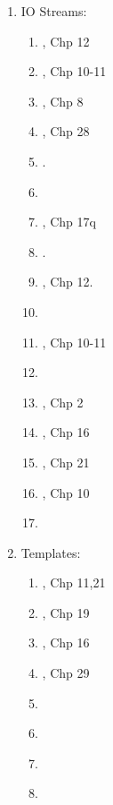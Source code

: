 \begin{enumerate}
\begin{enumerate}
\begin{enumerate}
		\end{enumerate}
	\end{enumerate}
\item IO Streams: \vspace{-0.3cm}
	\begin{enumerate} \itemsep -2pt
	\item \cite{Gregoire2014}, Chp 12
	\item \cite{Stroustrup2014}, Chp 10-11
	\item \cite{Lippman2013}, Chp 8
	\item \cite{Allain2012}, Chp 28
	\item \cite[chp. 12]{Gaddis2012}.
	\item \cite[pp. 743--847]{Josuttis2012}
	\item \cite{Prata2012}, Chp 17q
	\item \cite[Chp. 13]{Gaddis2011}.
	\item \cite{Gaddis2010}, Chp 12.
	\item \cite[\S2.2; Chp. 6]{Savitch2009}
	\item \cite{Stroustrup2009}, Chp 10-11
	\item \cite[\S14.3-14.8]{Scheinerman2006}
	\item \cite{Eckel2003}, Chp 2
	\item \cite{Oualline2003}, Chp 16
	\item \cite{Schildt2003}, Chp 21
	\item \cite{Vermeir2001}, Chp 10
	\item \cite[pp. 4, 12--15, 49--51, 150--154, 352, 361--365, 497--498]{Horstmann2012}
	\end{enumerate}
\item Templates: \vspace{-0.3cm}
	\begin{enumerate} \itemsep -2pt
	\item \cite{Gregoire2014}, Chp 11,21
	\item \cite{Stroustrup2014}, Chp 19
	\item \cite{Lippman2013}, Chp 16
	\item \cite{Allain2012}, Chp 29
	\item \cite[\S16.2--\S16.4]{Gaddis2012}
	\item \cite[pp. 13, 26--27, 33--34, 36, 62, 68, 1024]{Josuttis2012}
	\item \cite[\S16.2--\S16.4]{Gaddis2011}
	\item \cite[Chp. 17]{Savitch2009}

\end{enumerate}
\end{enumerate}
